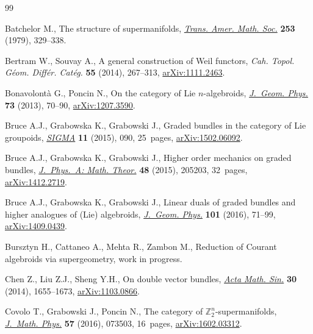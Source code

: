 \begin{thebibliography}{99}
\footnotesize\itemsep=0pt

Batchelor M., The structure of supermanifolds, \href{http://dx.doi.org/10.2307/1998201}{\textit{Trans. Amer. Math. Soc.}}
  \textbf{253} (1979), 329--338.

Bertram W., Souvay A., A general construction of {W}eil functors, \textit{Cah.
  Topol. G\'eom. Diff\'er. Cat\'eg.} \textbf{55} (2014), 267--313,
  \href{http://arxiv.org/abs/1111.2463}{arXiv:1111.2463}.

Bonavolont{\`a} G., Poncin N., On the category of {L}ie {$n$}-algebroids,
  \href{http://dx.doi.org/10.1016/j.geomphys.2013.05.004}{\textit{J.~Geom. Phys.}} \textbf{73} (2013), 70--90, \href{http://arxiv.org/abs/1207.3590}{arXiv:1207.3590}.

Bruce A.J., Grabowska K., Grabowski J., Graded bundles in the category of {L}ie
  groupoids, \href{http://dx.doi.org/10.3842/SIGMA.2015.090}{\textit{SIGMA}} \textbf{11} (2015), 090, 25~pages,
  \href{http://arxiv.org/abs/1502.06092}{arXiv:1502.06092}.

Bruce A.J., Grabowska K., Grabowski J., Higher order mechanics on graded
  bundles, \href{http://dx.doi.org/10.1088/1751-8113/48/20/205203}{\textit{J.~Phys.~A: Math. Theor.}} \textbf{48} (2015), 205203,
  32~pages, \href{http://arxiv.org/abs/1412.2719}{arXiv:1412.2719}.

Bruce A.J., Grabowska K., Grabowski J., Linear duals of graded bundles and
  higher analogues of ({L}ie) algebroids, \href{http://dx.doi.org/10.1016/j.geomphys.2015.12.004}{\textit{J.~Geom. Phys.}} \textbf{101}
  (2016), 71--99, \href{http://arxiv.org/abs/1409.0439}{arXiv:1409.0439}.

Bursztyn H., Cattaneo A., Mehta R., Zambon M., Reduction of Courant algebroids
  via supergeometry, work in progress.

Chen Z., Liu Z.J., Sheng Y.H., On double vector bundles, \href{http://dx.doi.org/10.1007/s10114-014-2412-4}{\textit{Acta Math.
  Sin.}} \textbf{30} (2014), 1655--1673, \href{http://arxiv.org/abs/1103.0866}{arXiv:1103.0866}.

Covolo T., Grabowski J., Poncin N., The category of {${\mathbb
  Z}_2^n$}-supermanifolds, \href{http://dx.doi.org/10.1063/1.4955416}{\textit{J.~Math. Phys.}} \textbf{57} (2016), 073503,
  16~pages, \href{http://arxiv.org/abs/1602.03312}{arXiv:1602.03312}.


\end{thebibliography}

